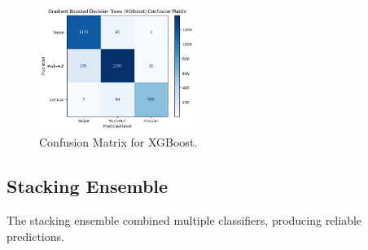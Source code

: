 \documentclass[10pt,twocolumn,letterpaper]{article}
\begin{document}
\begin{table}[h]
\small
\begin{center}
\caption{Performance Metrics for XGBoost}
\vspace{0.1cm}
\end{center}
\end{table}

\begin{figure}[h]
  \centering
  \includegraphics[width=0.45\textwidth]{figures/confusion_matrix_xgb.png}
  \caption{Confusion Matrix for XGBoost.}
  \label{fig:confusion_matrix_xgb}
\end{figure}

\subsection{Stacking Ensemble}

The stacking ensemble combined multiple classifiers, producing reliable predictions.

\begin{table}[h]
\small
\begin{center}
\caption{Performance Metrics for Stacking Ensemble}
\vspace{0.1cm}
\end{center}
\end{table}
\end{document}
